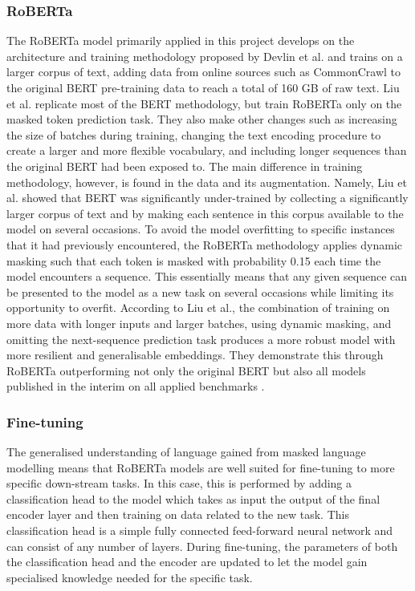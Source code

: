 \documentclass[12pt]{report}
\begin{document}
\subsubsection*{RoBERTa}
The RoBERTa model primarily applied in this project develops on the architecture and training methodology proposed by Devlin et al. \citeyear{BERT} and trains on a larger corpus of text, adding data from online sources such as CommonCrawl to the original BERT pre-training data to reach a total of 160 GB of raw text.
Liu et al. \citeyear{roberta} replicate most of the BERT methodology, but train RoBERTa only on the masked token prediction task.
They also make other changes such as increasing the size of batches during training, changing the text encoding procedure to create a larger and more flexible vocabulary, and including longer sequences than the original BERT had been exposed to.
The main difference in training methodology, however, is found in the data and its augmentation.
Namely, Liu et al. showed that BERT was significantly under-trained by collecting a significantly larger corpus of text and by making each sentence in this corpus available to the model on several occasions.
To avoid the model overfitting to specific instances that it had previously encountered, the RoBERTa methodology applies dynamic masking such that each token is masked with probability 0.15 each time the model encounters a sequence.
This essentially means that any given sequence can be presented to the model as a new task on several occasions while limiting its opportunity to overfit.
According to Liu et al., the combination of training on more data with longer inputs and larger batches, using dynamic masking, and omitting the next-sequence prediction task produces a more robust model with more resilient and generalisable embeddings.
They demonstrate this through RoBERTa outperforming not only the original BERT but also all models published in the interim on all applied benchmarks \cite{roberta}.

\subsubsection*{Fine-tuning}
The generalised understanding of language gained from masked language modelling means that RoBERTa models are well suited for fine-tuning to more specific down-stream tasks.
In this case, this is performed by adding a classification head to the model which takes as input the output of the final encoder layer and then training on data related to the new task.
This classification head is a simple fully connected feed-forward neural network and can consist of any number of layers.
During fine-tuning, the parameters of both the classification head and the encoder are updated to let the model gain specialised knowledge needed for the specific task.
\end{document}

